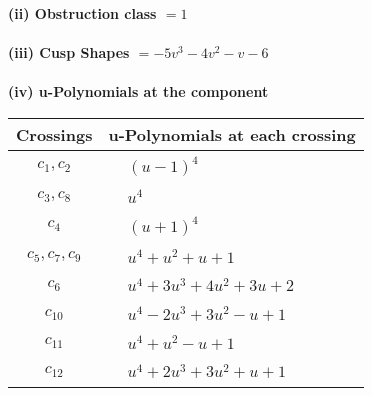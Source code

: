 \documentclass[1p]{elsarticle_modified}
\theoremstyle{definition}
\begin{document}
\flushleft \textbf{(ii) Obstruction class $= 1$}\\~\\
\flushleft \textbf{(iii) Cusp Shapes $= -5 v^3-4 v^2- v-6$}\\~\\
\newpage\renewcommand{\arraystretch}{1}
\flushleft \textbf{(iv) u-Polynomials at the component}\newline \\
\begin{tabular}{m{50pt}|m{274pt}}
Crossings & \hspace{64pt}u-Polynomials at each crossing \\
\hline $$\begin{aligned}c_{1},c_{2}\end{aligned}$$&$\begin{aligned}
&(u-1)^4
\end{aligned}$\\
\hline $$\begin{aligned}c_{3},c_{8}\end{aligned}$$&$\begin{aligned}
&u^4
\end{aligned}$\\
\hline $$\begin{aligned}c_{4}\end{aligned}$$&$\begin{aligned}
&(u+1)^4
\end{aligned}$\\
\hline $$\begin{aligned}c_{5},c_{7},c_{9}\end{aligned}$$&$\begin{aligned}
&u^4+u^2+u+1
\end{aligned}$\\
\hline $$\begin{aligned}c_{6}\end{aligned}$$&$\begin{aligned}
&u^4+3 u^3+4 u^2+3 u+2
\end{aligned}$\\
\hline $$\begin{aligned}c_{10}\end{aligned}$$&$\begin{aligned}
&u^4-2 u^3+3 u^2- u+1
\end{aligned}$\\
\hline $$\begin{aligned}c_{11}\end{aligned}$$&$\begin{aligned}
&u^4+u^2- u+1
\end{aligned}$\\
\hline $$\begin{aligned}c_{12}\end{aligned}$$&$\begin{aligned}
&u^4+2 u^3+3 u^2+u+1
\end{aligned}$\\
\hline
\end{tabular}\\~\\
\end{document}
